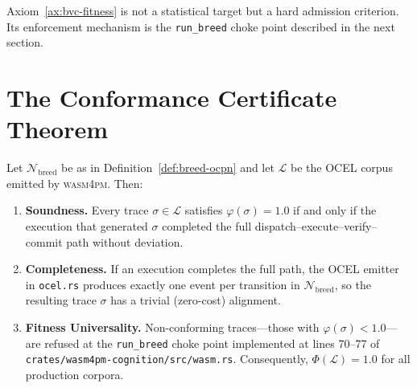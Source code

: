 Axiom~\ref{ax:bvc-fitness} is not a statistical target but a hard
admission criterion.  Its enforcement mechanism is the \texttt{run\_breed}
choke point described in the next section.

\section{The Conformance Certificate Theorem}
\label{sec:conformance-certificate}

\begin{theorem}
\label{thm:conformance-certificate}
\label{thm:ocel-conformance}
Let $\mathcal{N}_{\mathrm{breed}}$ be as in Definition~\ref{def:breed-ocpn}
and let $\mathcal{L}$ be the OCEL corpus emitted by \textsc{wasm4pm}.
Then:

\begin{enumerate}[label=(\roman*)]
  \item \textbf{Soundness.}  Every trace $\sigma \in \mathcal{L}$
    satisfies $\varphi(\sigma) = 1.0$ if and only if the execution that
    generated $\sigma$ completed the full dispatch--execute--verify--commit
    path without deviation.

  \item \textbf{Completeness.}  If an execution completes the full path,
    the OCEL emitter in \texttt{ocel.rs} produces exactly one event per
    transition in $\mathcal{N}_{\mathrm{breed}}$, so the resulting trace
    $\sigma$ has a trivial (zero-cost) alignment.

  \item \textbf{Fitness Universality.}  Non-conforming traces---those with
    $\varphi(\sigma) < 1.0$---are refused at the \texttt{run\_breed} choke
    point implemented at lines 70--77 of
    \texttt{crates/wasm4pm-cognition/src/wasm.rs}.  Consequently,
    $\Phi(\mathcal{L}) = 1.0$ for all production corpora.
\end{enumerate}
\end{theorem}

